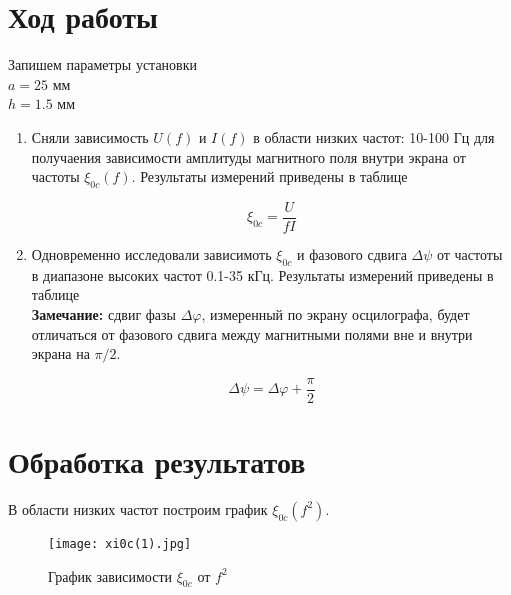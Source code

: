 


    

    \section{Ход работы}

    \begin{center}
        Запишем параметры установки \\
        $a = 25$ мм \\
        $h = 1.5$ мм
    \end{center}

    \begin{enumerate}
        \item Сняли зависимость $U(f)$ и $I(f)$ в области низких частот: 10-100 Гц для получаения зависимости
        амплитуды магнитного поля внутри экрана от частоты $\xi_{0c}(f)$. Результаты измерений приведены в таблице %

        \begin{equation}
            \xi_{0c} = \frac{U}{f I}
        \end{equation}

        \item Одновременно исследовали зависимоть $\xi_{0c}$ и фазового сдвига $\Delta \psi$ от частоты в диапазоне высоких частот
        0.1-35 кГц. Результаты измерений приведены в таблице %
        \\
        \textbf{Замечание:} сдвиг фазы $\Delta \varphi$, измеренный по экрану осцилографа, будет отличаться от
        фазового сдвига между магнитными полями вне и внутри экрана на $\pi/2$.

        \[ \Delta \psi = \Delta \varphi + \frac{\pi}{2} \]
    \end{enumerate}

    

    

    \section{Обработка результатов}

    В области низких частот построим график $\xi_{0c}(f^2)$.

    \begin{figure}
        \centering
        \texttt{[image: xi0c(1).jpg]}
        \caption{График зависимости $\xi_{0c}$ от $f^2$}
        \label{xi0c(1)}
    \end{figure}

